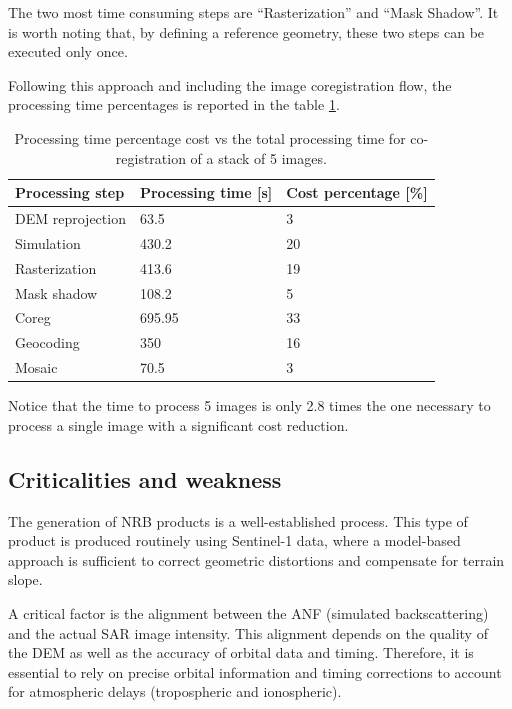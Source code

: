 The two most time consuming steps are ``Rasterization'' and ``Mask Shadow''. It is worth noting that, by defining a reference geometry, these two steps can be executed only once.

Following this approach and including the image coregistration flow, the processing time percentages is reported in the table \ref{tab:processing_time_single}.

\begin{table}[ht]
  \centering
  \caption{Processing time percentage cost vs the total processing time for co-registration of a stack of 5 images.}
  \label{tab:processing_time_single}
  \begin{tabular}{lll}
    \hline
    Processing step & Processing time [s] & Cost percentage [\%]\\ 
    \hline
    DEM reprojection    & 63.5 & 3     \\
    Simulation   & 430.2 & 20      \\
    Rasterization  & 413.6  & 19      \\
    Mask shadow    & 108.2 & 5      \\
    Coreg   & 695.95 & 33      \\
    Geocoding    & 350 & 16      \\
    Mosaic    & 70.5 & 3      \\
    \hline
  \end{tabular}
\end{table}

Notice that the time to process 5 images is only 2.8 times the one necessary to process a single image with a significant cost reduction. 

\subsection{Criticalities and weakness}
\label{sec:nrb_criticalities}

The generation of NRB products is a well-established process. This type of product is produced routinely using Sentinel-1 data, where a model-based approach is sufficient to correct geometric distortions and compensate for terrain slope.

A critical factor is the alignment between the ANF (simulated backscattering) and the actual SAR image intensity. This alignment depends on the quality of the DEM as well as the accuracy of orbital data and timing. Therefore, it is essential to rely on precise orbital information and timing corrections to account for atmospheric delays (tropospheric and ionospheric).

